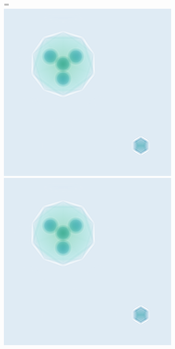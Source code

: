 \begin{figure} %
	\begin{subfigure}[b]{0.49\textwidth}
		=\hbox{\includegraphics[width=\textwidth]{images/fig_simholo_v2_exitwave.png}}
		\includegraphics[width=\textwidth]{images/fig_simholo_v2_exitwave.png}

\end{subfigure}
\end{figure}
